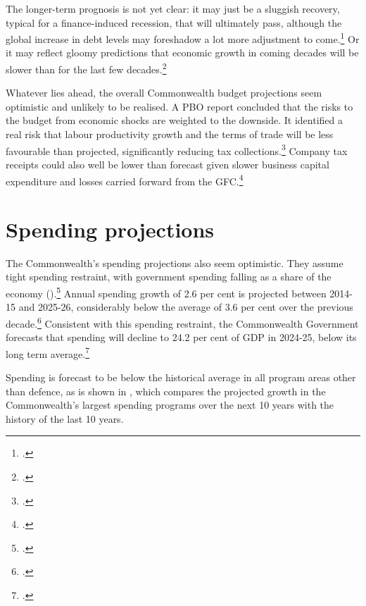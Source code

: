 \documentclass[twoside,english]{grattanBudgetRepairb5portrait}
\begin{document}
The longer-term prognosis is not yet clear:  it may just be a sluggish recovery, typical for a finance-induced recession, that will ultimately pass,  although the global increase in debt levels may foreshadow a lot more adjustment to come.\footcites{BailyBosworth2013}{RoxburghLundWimmerEtAl2011} Or it may reflect gloomy predictions that economic growth in coming decades will be slower than for the last few decades.\footcite[][footnote~23]{RoxburghLundWimmerEtAl2011} 

Whatever lies ahead, the overall Commonwealth budget projections seem optimistic and unlikely to be realised. A PBO report concluded that the risks to the budget from economic shocks are weighted to the downside. It identified a real risk that labour productivity growth and the terms of trade will be less favourable than projected, significantly reducing tax collections.\footcite{PBO2014TrendsAustralianGovtReceipts1982to2013}  Company tax receipts could also well be lower than forecast given slower business capital expenditure  and losses carried forward from the GFC.\footcite[][38--44]{RBA2015a}

\section{Spending projections}
The Commonwealth’s spending projections also seem optimistic. They assume tight spending restraint, with government spending falling as a share of the economy ().\footcite[][5--11]{Treasury2015BudgetPapers201516}  Annual spending growth of 2.6 per cent is projected between 2014-15 and 2025-26, considerably below the average of 3.6 per cent over the previous decade.\footcite[][5]{PBO2015}  Consistent with this spending restraint, the Commonwealth Government forecasts that spending will decline to 24.2 per cent of GDP in 2024-25, below its long term average.\footcite[][3--9]{Treasury2015BudgetPapers201516}  

Spending is forecast to be below the historical average in all program areas other than defence, as is shown in , which compares the projected growth in the Commonwealth’s largest spending programs over the next 10 years with the history of the last 10 years. 
\end{document}

